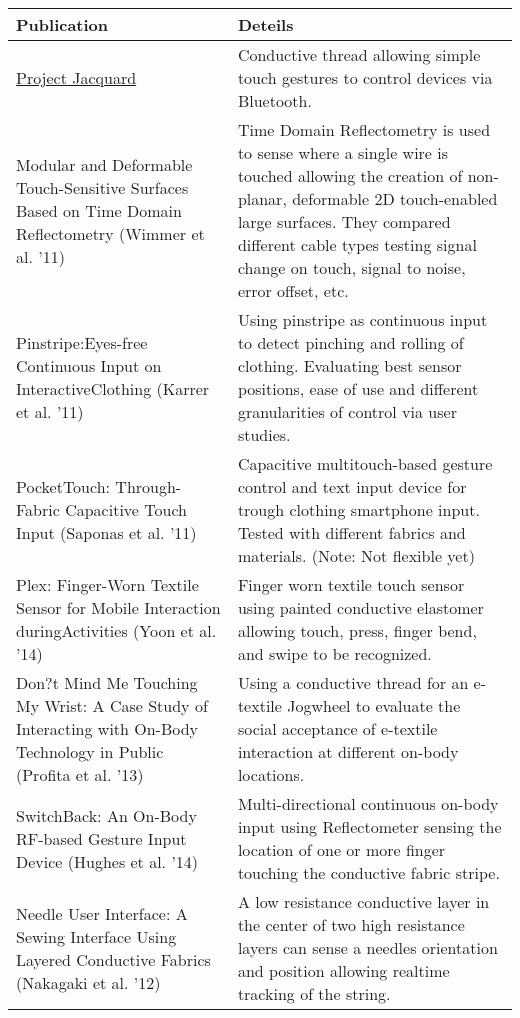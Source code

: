 \documentclass[10pt,a4paper]{article}
\begin{document}
    \begin{tabular}{ | p{3cm} |  p{8.3cm} |}
    \hline
    Publication & Deteils \\ 
    \hline 
    
    \href{http://www.fastcodesign.com/3046864/meet-project-jacquard-googles-plan-to-turn-    all-your-clothes-into-a-touchscreen#11}{Project Jacquard} &  
	Conductive thread allowing simple touch gestures to control devices via Bluetooth.\\ 
    \hline
    
    Modular and Deformable Touch-Sensitive Surfaces Based on Time Domain Reflectometry (Wimmer et al. '11) &  
    Time Domain Reflectometry is used to sense where a single wire is touched allowing the creation of non-planar, deformable 2D touch-enabled large surfaces. They compared different cable types testing signal change on touch, signal to noise, error offset, etc.\\
    \hline
    
    Pinstripe:Eyes-free Continuous Input on InteractiveClothing (Karrer et al. '11)&
    Using pinstripe as continuous input to detect pinching and rolling of clothing. Evaluating best sensor positions, ease of use and different granularities of control via user studies.\\ 
    \hline
    
    PocketTouch: Through-Fabric Capacitive Touch Input (Saponas et al. '11)&
    Capacitive multitouch-based gesture control and text input device for trough clothing smartphone input. Tested with different fabrics and materials. (Note: Not flexible yet)\\
    \hline
    
    Plex: Finger-Worn Textile Sensor for Mobile Interaction duringActivities (Yoon et al. '14) &
    Finger worn textile touch sensor using painted conductive elastomer allowing touch, press, finger bend, and swipe to be recognized. \\
    \hline
    
    Don?t Mind Me Touching My Wrist: A Case Study of Interacting with On-Body Technology in Public (Profita et al. '13) &
    Using a conductive thread for an e-textile Jogwheel to evaluate the social acceptance of e-textile interaction at different on-body locations.\\
    \hline
    
    SwitchBack: An On-Body RF-based Gesture Input Device (Hughes et al. '14) &
    Multi-directional continuous on-body input using Reflectometer sensing the location of one or more finger touching the conductive fabric stripe.\\
    \hline
    
    Needle User Interface:  A Sewing Interface Using Layered Conductive Fabrics (Nakagaki et al. '12) &
    A low resistance conductive layer in the center of two high resistance  layers can sense a needles orientation and position allowing realtime tracking of the string.\\
    \hline
    
    \end{tabular}
    
\end{document}
